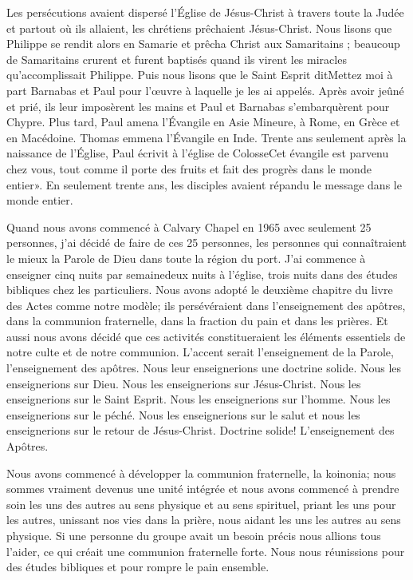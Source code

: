 Les persécutions avaient dispersé l’Église de Jésus-Christ à travers toute la Judée et partout où ils allaient, les
chrétiens prêchaient Jésus-Christ. Nous lisons que Philippe se rendit alors en Samarie et prêcha Christ aux Samaritains
; beaucoup de Samaritains crurent et furent baptisés quand ils virent les miracles qu’accomplissait Philippe. Puis nous
lisons que le Saint Esprit dit\frcolon\og Mettez moi à part Barnabas et Paul pour l’œuvre à laquelle je les ai appelés.\fg{} Après
avoir jeûné et prié, ils leur imposèrent les mains et Paul et Barnabas s’embarquèrent pour Chypre. Plus tard, Paul
amena l’Évangile en Asie Mineure, à Rome, en Grèce et en Macédoine. Thomas emmena l’Évangile en Inde. Trente
ans seulement après la naissance de l’Église, Paul écrivit à l’église de Colosse\frcolon\og Cet évangile est parvenu chez vous,
tout comme il porte des fruits et fait des progrès dans le monde entier». En seulement trente ans, les disciples
avaient répandu le message dans le monde entier.

Quand nous avons commencé à Calvary Chapel en 1965 avec seulement 25 personnes, j’ai décidé de faire de ces 25
personnes, les personnes qui connaîtraient le mieux la Parole de Dieu dans toute la région du port. J’ai commence à
enseigner cinq nuits par semaine\frcolon deux nuits à l'église, trois nuits dans des études bibliques chez les particuliers. Nous
avons adopté le deuxième chapitre du livre des Actes comme notre modèle; \og ils persévéraient dans l’enseignement
des apôtres, dans la communion fraternelle, dans la fraction du pain et dans les prières.\fg{} Et aussi nous avons décidé
que ces activités constitueraient les éléments essentiels de notre culte et de notre communion. L’accent serait
l’enseignement de la Parole, \og l’enseignement des apôtres\fg{}. Nous leur enseignerions une doctrine solide. Nous les
enseignerions sur Dieu. Nous les enseignerions sur Jésus-Christ. Nous les enseignerions sur le Saint Esprit. Nous les
enseignerions sur l’homme. Nous les enseignerions sur le péché. Nous les enseignerions sur le salut et nous les
enseignerions sur le retour de Jésus-Christ. Doctrine solide! L’enseignement des Apôtres.

Nous avons commencé à développer la communion fraternelle, la \og koinonia\fg{}; nous sommes vraiment devenus une
\og unité intégrée\fg{} et nous avons commencé à prendre soin les uns des autres au sens physique et au sens spirituel,
priant les uns pour les autres, unissant nos vies dans la prière, nous aidant les uns les autres au sens physique. Si une
personne du groupe avait un besoin précis nous allions tous l’aider, ce qui créait une communion fraternelle forte.
Nous nous réunissions pour des études bibliques et pour rompre le pain ensemble.

